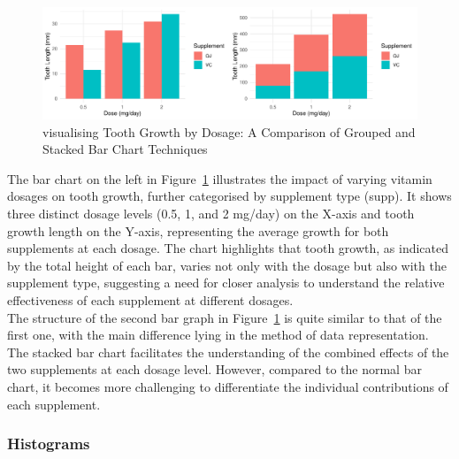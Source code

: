 \documentclass{article}\usepackage[]{graphicx}\usepackage[]{xcolor}
\makeatletter
\def\maxwidth{ %
  \ifdim\Gin@nat@width>\linewidth
    \linewidth
  \else
    \Gin@nat@width
  \fi
}
\newenvironment{knitrout}{}{} %
\makeatother
\begin{document}
\begin{knitrout}\scriptsize
{}\color{fgcolor}\begin{figure}[H]

{\centering \includegraphics[width=\maxwidth]{figure/beamer-barcharts-1} 

}

\caption[visualising Tooth Growth by Dosage]{visualising Tooth Growth by Dosage: A Comparison of Grouped and Stacked Bar Chart Techniques}\label{fig:barcharts}
\end{figure}

\end{knitrout}

\noindent 
The bar chart on the left in Figure~\ref{fig:barcharts} illustrates the impact of varying vitamin dosages on tooth growth, further categorised by supplement type (supp). It shows three distinct dosage levels (0.5, 1, and 2 mg/day) on the X-axis and tooth growth length on the Y-axis, representing the average growth for both supplements at each dosage. The chart highlights that tooth growth, as indicated by the total height of each bar, varies not only with the dosage but also with the supplement type, suggesting a need for closer analysis to understand the relative effectiveness of each supplement at different dosages.\\

\noindent
The structure of the second bar graph in Figure~\ref{fig:barcharts} is quite similar to that of the first one, with the main difference lying in the method of data representation. The stacked bar chart facilitates the understanding of the combined effects of the two supplements at each dosage level. However, compared to the normal bar chart, it becomes more challenging to differentiate the individual contributions of each supplement.\\

\subsubsection{Histograms}
\end{document}
